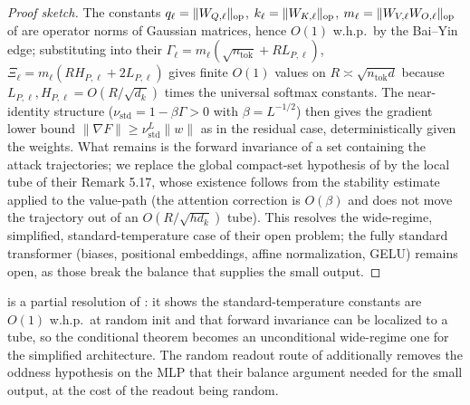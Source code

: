 \begin{proof}[Proof sketch]
The constants $q_\ell=\|W_{Q,\ell}\|_{\mathrm{op}}$, $k_\ell=\|W_{K,\ell}\|_{\mathrm{op}}$, $m_\ell=\|W_{V,\ell}W_{O,\ell}\|_{\mathrm{op}}$
of \cite[Thm 5.16]{advExt} are operator norms of Gaussian matrices, hence $O(1)$ w.h.p.\ by the
Bai--Yin edge; substituting into their $\Gamma_\ell=m_\ell(\sqrt{n_{\mathrm{tok}}}+RL_{P,\ell})$,
$\Xi_\ell=m_\ell(RH_{P,\ell}+2L_{P,\ell})$ gives finite $O(1)$ values on $R\asymp\sqrt{n_{\mathrm{tok}}d}$
because $L_{P,\ell},H_{P,\ell}=O(R/\sqrt{d_k})$ times the universal softmax constants. The
near-identity structure ($\nu_{\mathrm{std}}=1-\beta\Gamma>0$ with $\beta=L^{-1/2}$) then gives the
gradient lower bound $\|\nabla F\|\ge\nu_{\mathrm{std}}^L\|w\|$ as in the residual case, deterministically
given the weights. What remains is the forward invariance of a set containing the attack trajectories;
we replace the global compact-set hypothesis of \cite[Thm 5.16]{advExt} by the local tube of their
Remark 5.17, whose existence follows from the stability estimate  applied to the
value-path (the attention correction is $O(\beta)$ and does not move the trajectory out of an
$O(R/\sqrt{hd_k})$ tube). This resolves the wide-regime, simplified, standard-temperature case of their
open problem; the fully standard transformer (biases, positional embeddings, affine normalization,
GELU) remains open, as those break the balance that supplies the small output.
\end{proof}

\begin{remark}
 is a partial resolution of \cite[Rem 5.20]{advExt}: it shows the standard-temperature
constants are $O(1)$ w.h.p.\ at random init and that forward invariance can be localized to a tube, so
the conditional theorem becomes an unconditional wide-regime one for the simplified architecture. The
random readout route of  additionally removes the oddness hypothesis on the MLP that
their balance argument needed for the small output, at the cost of the readout being random.
\end{remark}
